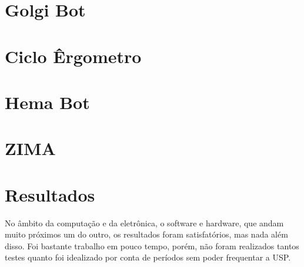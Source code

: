 \documentclass[]{politex}
\begin{document}

\part{Golgi Bot} 





\part{Ciclo Êrgometro} 





\part{Hema Bot} 





\part{ZIMA} 






\begin{comment} %



\end{comment}

\part{Resultados}

No âmbito da computação e da eletrônica, o software e hardware, que andam muito próximos um do outro, os resultados foram satisfatórios, mas nada além disso. Foi bastante trabalho em pouco tempo, porém, não foram realizados tantos testes quanto foi idealizado por conta de períodos sem poder frequentar a USP.
\end{document}

